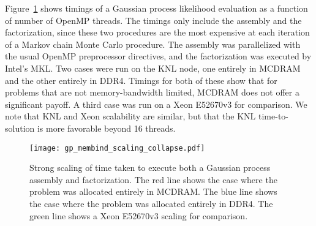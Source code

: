 Figure~\ref{fig:gp} shows timings of a Gaussian process likelihood evaluation
as a function of number of OpenMP threads.  The timings only include the
assembly and the factorization, since these two procedures are the most
expensive at each iteration of a Markov chain Monte Carlo procedure.  The
assembly was parallelized with the usual OpenMP preprocessor directives, and
the factorization was executed by Intel's MKL.  Two cases were run on the KNL
node, one entirely in MCDRAM and the other entirely in DDR4.  Timings for both
of these show that for problems that are not memory-bandwidth limited, MCDRAM
does not offer a significant payoff.  A third case was run on a Xeon E52670v3
for comparison.  We note that KNL and Xeon scalability are similar, but
that the KNL time-to-solution is more favorable beyond 16 threads.

%
%
\begin{figure}
  \begin{center}
    \texttt{[image: gp\_membind\_scaling\_collapse.pdf]}
    \caption{Strong scaling of time taken to execute both a Gaussian process
    assembly and factorization.  The red line shows the case where the problem
    was allocated entirely in MCDRAM.  The blue line shows the case where the
    problem was allocated entirely in DDR4.  The green line shows a Xeon E52670v3
    scaling for comparison.}
    \label{fig:gp}
  \end{center}
\end{figure}
